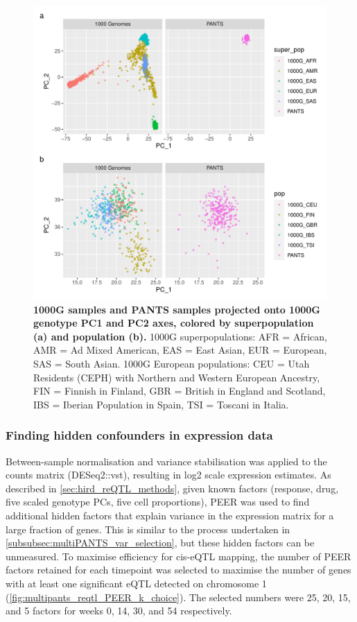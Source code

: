 \begin{figure}
    \centering
    \includegraphics[width=1.0\textwidth,page=1]{mainmatter/figures/chapter_04/pants_samples.sampleids_cleaned_to_lowercase.filtered.GRCh38.sorted.multiPANTS.projection_1000G_pca.pdf}
    \caption{
        \textbf{1000G samples and PANTS samples projected onto 1000G genotype PC1 and PC2 axes, colored by superpopulation (a) and population (b).}
        1000G superpopulations: AFR = African, AMR = Ad Mixed American, EAS = East Asian, EUR = European, SAS = South Asian.
        1000G European populations: CEU = Utah Residents (CEPH) with Northern and Western European Ancestry, FIN = Finnish in Finland, GBR = British in England and Scotland, IBS = Iberian Population in Spain, TSI = Toscani in Italia.
    }
    \label{fig:multipants_genotype_akt_1000g_pca}
\end{figure}

\subsubsection{Finding hidden confounders in expression data}

Between-sample normalisation and variance stabilisation was applied to the counts matrix (DESeq2::vst), resulting in log2 scale expression estimates.
As described in \cref{sec:hird_reQTL_methods},
given known factors (response, drug, five scaled genotype \glspl{PC}, five cell proportions), 
{PEER} was used to find additional hidden factors that explain variance in the expression matrix for a large fraction of genes.
This is similar to the process undertaken in \cref{subsubsec:multiPANTS_var_selection}, but these hidden factors can be unmeasured.
To maximise efficiency for cis-\gls{eQTL} mapping, 
the number of PEER factors retained for each timepoint was selected to maximise the number of genes with at least one significant \gls{eQTL} detected on chromosome 1 (\cref{fig:multipants_reqtl_PEER_k_choice}).
The selected numbers were 25, 20, 15, and 5 factors for weeks 0, 14, 30, and 54 respectively.

